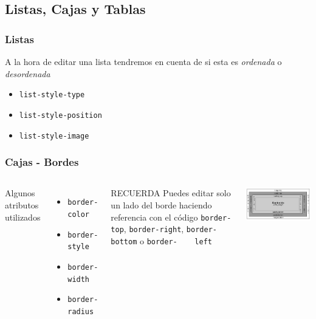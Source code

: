 \documentclass{beamer}
\begin{document}
	\subsection{Listas, Cajas y Tablas}
\begin{frame}[fragile] %
\frametitle{Listas}
	A la hora de editar una lista tendremos en cuenta de si esta es \textit{ordenada} o \textit{desordenada}
	\begin{itemize}
	\item \verb|list-style-type|
	\item \verb|list-style-position|
	\item \verb|list-style-image|
	\end{itemize}
\end{frame}

\begin{frame}[fragile] %
\frametitle{Cajas - Bordes}
	\begin{columns}[c]
	Algunos atributos utilizados
	\begin{itemize}
	\item \verb|border-color|
	\item \verb|border-style|
	\item \verb|border-width|
	\item \verb|border-radius|
	\end{itemize}
	
	\begin{exampleblock}{RECUERDA}
	Puedes editar solo un lado del borde haciendo referencia con el código \verb|border-top|, \verb|border-right|, \verb|border-bottom| o  \verb|border-	left|
	\end{exampleblock}
	\begin{center}
	\includegraphics[scale=.3]{images/ModeloCajas.jpg} 
	\end{center}
	\end{columns}
\end{frame}
\end{document}

